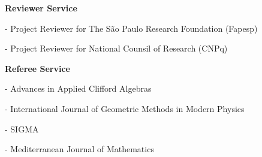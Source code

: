 \documentclass[10pt]{article}
\newenvironment{innerlist}[1][\enskip\textbullet]%
        {\begin{compactitem}[#1]}{\end{compactitem}}
\newcommand{\blankline}{\quad\pagebreak[2]}
\begin{document}
   \blankline
   
   \textbf{Reviewer Service}
   \begin{innerlist}
\item[]- Project Reviewer for The São Paulo Research Foundation (Fapesp)
\item[]- Project Reviewer for National Counsil of Research (CNPq)
   \end{innerlist}
	 
	 \blankline
	 
	 \textbf{Referee Service}
		\begin{innerlist}
   \item[]- Advances in Applied Clifford Algebras
\item[]- International Journal of Geometric Methods in Modern Physics
\item[]- SIGMA
\item[]- Mediterranean Journal of Mathematics
		\end{innerlist}
				

\end{document}
